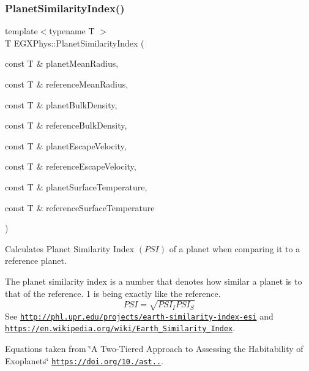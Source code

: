 \subsubsection{\texorpdfstring{Planet\+Similarity\+Index()}{PlanetSimilarityIndex()}}
{\footnotesize\ttfamily template$<$typename T $>$ \\
T E\+G\+X\+Phys\+::\+Planet\+Similarity\+Index (\begin{DoxyParamCaption}\item[{const T \&}]{planet\+Mean\+Radius,  }\item[{const T \&}]{reference\+Mean\+Radius,  }\item[{const T \&}]{planet\+Bulk\+Density,  }\item[{const T \&}]{reference\+Bulk\+Density,  }\item[{const T \&}]{planet\+Escape\+Velocity,  }\item[{const T \&}]{reference\+Escape\+Velocity,  }\item[{const T \&}]{planet\+Surface\+Temperature,  }\item[{const T \&}]{reference\+Surface\+Temperature }\end{DoxyParamCaption})}



Calculates Planet Similarity Index $(PSI)$ of a planet when comparing it to a reference planet. 

The planet similarity index is a number that denotes how similar a planet is to that of the reference. 1 is being exactly like the reference. \[PSI=\sqrt{PSI_I PSI_S}\] See \href{http://phl.upr.edu/projects/earth-similarity-index-esi}{\tt http\+://phl.\+upr.\+edu/projects/earth-\/similarity-\/index-\/esi} and \href{https://en.wikipedia.org/wiki/Earth_Similarity_Index}{\tt https\+://en.\+wikipedia.\+org/wiki/\+Earth\+\_\+\+Similarity\+\_\+\+Index}.

Equations taken from \char`\"{}\+A Two-\/\+Tiered Approach to Assessing the Habitability of Exoplanets\char`\"{} \href{https://doi.org/10.1089/ast.2010.0592}{\tt https\+://doi.\+org/10./ast..}.


